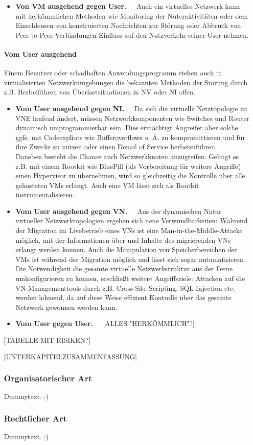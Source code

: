 \begin{itemize}
\item \textbf{Von VM ausgehend gegen User.~~}
Auch ein virtuelles Netzwerk kann mit herkömmlichen Methoden wie Monitoring der Nuteraktivitäten oder dem Einschleusen von konstruierten Nachrichten zur Störung oder Abbruch von Peer-to-Peer-Verbindungen Einfluss auf den Nutzverkehr seiner User nehmen.
\end{itemize}



\paragraph{Vom User ausgehend}
\label{parag:vonUser}
Einem Benutzer oder schadhaften Anwendungsprogramm stehen auch in virtualisierten Netzwerkumgebungen die bekannten Methoden der Störung durch z.B. Herbeiführen von Überlastsituationen in NV oder NI offen.

\begin{itemize}
	\item \textbf{Vom User ausgehend gegen NI.~~}
	Da sich die virtuelle Netztopologie im VNE laufend ändert, müssen Netzwerkkomponenten wie Switches und Router dynamisch umprogrammierbar sein. Dies ermächtigt Angreifer aber solche ggfs. mit Codeexpliots wie Bufferoverflows o. Ä. zu kompromittieren und für ihre Zwecke zu nutzen oder einen Denail of Service herbeizuführen.\\
	Daneben besteht die Chance auch Netzwerkknoten anzugreifen. Gelingt es z.B. mit einem Rootkit wie BluePill \cite{rutkowska2008bluepilling} (als Vorbereitung für weitere Angriffe) einen Hypervisor zu übernehmen, wird so gleichzeitig die Kontrolle über alle gehosteten VMs erlangt. Auch eine VM lässt sich als Rootkit instrumentalisieren.\cite{wu2010network}
	\item \textbf{Vom User ausgehend gegen VN.~~}
	Aus der dynamischen Natur virtueller Netzwerktopologien ergeben sich neue Verwundbarkeiten: Während der Migration im Livebetrieb eines VNs ist eine Man-in-the-Middle-Attacke möglich, mit der Informationen über und Inhalte des migrierenden VNs erlangt werden können. \cite{natarajansecurity} Auch die Manipulation von Speicherbereichen der VMs ist während der Migration möglich und lässt sich sogar automatisieren.\cite{oberheide2008empirical}\\
	Die Notwendigkeit die gesamte virtuelle Netzwerkstruktur aus der Ferne umkonfigurieren zu können, erschließt weitere Angriffsziele: Attacken auf die VN-Managementtools durch z.B. Cross-Site-Scripting, SQL-Injection etc. werden lohnend, da auf diese Weise effizient Kontrolle über das gesamte Netzwerk gewonnen werden kann.	
	\item \textbf{Vom User gegen User.~~}
	[ALLES "HERKÖMMLICH"?]
\end{itemize}

[TABELLE MIT RISIKEN?]



[UNTERKAPITELZUSAMMENFASSUNG]


\subsubsection{Organisatorischer Art}
\label{subsubsec:gefahren_virt_organisatorisch}
Dummytext. :)

\subsubsection{Rechtlicher Art}
\label{subsubsec:gefahren_virt_rechtlich}
Dummytext. :)
